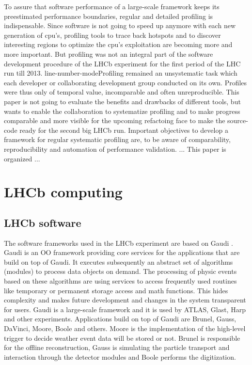 \documentclass[a4paper]{jpconf}
\begin{document}
To assure that software performance of a large-scale framework keeps its preestimated performance boundaries, regular and detailed profiling is indispensable. Since software is not going to speed up anymore with each new generation of cpu's, profiling tools to trace back hotspots and to discover interesting regions to optimize the cpu's exploitation are becoming more and more important. But profiling was not an integral part of the software development procedure of the LHCb experiment for the first period of the LHC run till 2013. line-number-modeProfiling remained an unsystematic task which each developer or collaborating development group conducted on its own. Profiles were thus only of temporal value, incomparable and often unreproducible. This paper is not going to evaluate the benefits and drawbacks of different tools, but wants to enable the collaboration to systematize profiling and to make progress comparable and more visible for the upcoming refactoing face to make the source-code ready for the second big LHCb run.
\newline
Important objectives to develop a framework for regular systematic profiling are, to be aware of comparability, reproducibility and automation of performance validation. ...
\newline
This paper is organized ...

\section{LHCb computing}
\label{sec:lhcb_computing}



\subsection{LHCb software}
\label{sec:lhcb_software}

The software frameworks used in the LHCb experiment are based on Gaudi \cite{gaudi}. Gaudi is an OO framework providing core services for the applications that are build on top of Gaudi. It executes subsequently an abstract set of algorithms (modules) to process data objects on demand. The processing of physic events based on these algorithms are using services to access frequently used routines like temporary or permanent storage access and math functions. This hides complexity and makes future development and changes in the system transparent for users. Gaudi is a large-scale framework and it is used by ATLAS, Glast, Harp and other experiments.
\newline
Applications build on top of Gaudi are Brunel, Gauss, DaVinci, Moore, Boole and others. Moore is the implementation of the high-level trigger to decide weather event data will be stored or not. Brunel is responsible for the offline reconstruction, Gauss is simulating the particle transport and interaction through the detector modules and Boole performs the digitization.
\end{document}
